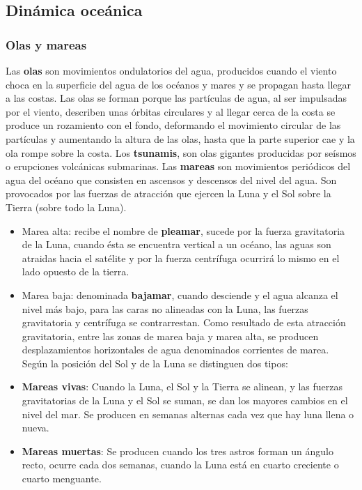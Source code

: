 \subsection{Dinámica oceánica}\label{header-n2}

\subsubsection{Olas y mareas}\label{header-n3}

Las \textbf{olas} son movimientos ondulatorios del agua, producidos
cuando el viento choca en la superficie del agua de los océanos y mares
y se propagan hasta llegar a las costas. Las olas se forman porque las
partículas de agua, al ser impulsadas por el viento, describen unas
órbitas circulares y al llegar cerca de la costa se produce un
rozamiento con el fondo, deformando el movimiento circular de las
partículas y aumentando la altura de las olas, hasta que la parte
superior cae y la ola rompe sobre la costa. Los \textbf{tsunamis}, son
olas gigantes producidas por seísmos o erupciones volcánicas submarinas.
Las \textbf{mareas} son movimientos periódicos del agua del océano que
consisten en ascensos y descensos del nivel del agua. Son provocados por
las fuerzas de atracción que ejercen la Luna y el Sol sobre la Tierra
(sobre todo la Luna).

\begin{itemize}
\item
  Marea alta: recibe el nombre de \textbf{pleamar}, sucede por la fuerza
  gravitatoria de la Luna, cuando ésta se encuentra vertical a un
  océano, las aguas son atraidas hacia el satélite y por la fuerza
  centrífuga ocurrirá lo mismo en el lado opuesto de la tierra.
\item
  Marea baja: denominada \textbf{bajamar}, cuando desciende y el agua
  alcanza el nivel más bajo, para las caras no alineadas con la Luna,
  las fuerzas gravitatoria y centrífuga se contrarrestan. Como resultado
  de esta atracción gravitatoria, entre las zonas de marea baja y marea
  alta, se producen desplazamientos horizontales de agua denominados
  corrientes de marea. Según la posición del Sol y de la Luna se
  distinguen dos tipos:
\item
  \textbf{Mareas vivas}: Cuando la Luna, el Sol y la Tierra se alinean,
  y las fuerzas gravitatorias de la Luna y el Sol se suman, se dan los
  mayores cambios en el nivel del mar. Se producen en semanas alternas
  cada vez que hay luna llena o nueva.
\item
  \textbf{Mareas muertas}: Se producen cuando los tres astros forman un
  ángulo recto, ocurre cada dos semanas, cuando la Luna está en cuarto
  creciente o cuarto menguante.
\end{itemize}

